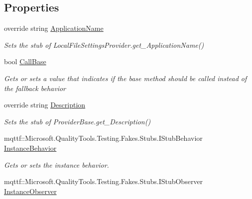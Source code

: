 \subsection*{Properties}
\begin{DoxyCompactItemize}
\item 
override string \hyperlink{class_system_1_1_configuration_1_1_fakes_1_1_stub_local_file_settings_provider_a649047c0f52d093bd5f410030531fea8}{Application\-Name}
\begin{DoxyCompactList}\small\item\em Sets the stub of Local\-File\-Settings\-Provider.\-get\-\_\-\-Application\-Name()\end{DoxyCompactList}\item 
bool \hyperlink{class_system_1_1_configuration_1_1_fakes_1_1_stub_local_file_settings_provider_a5ca3555caf680d27a3cd22b4a5126ff3}{Call\-Base}
\begin{DoxyCompactList}\small\item\em Gets or sets a value that indicates if the base method should be called instead of the fallback behavior\end{DoxyCompactList}\item 
override string \hyperlink{class_system_1_1_configuration_1_1_fakes_1_1_stub_local_file_settings_provider_af040d07048cc52477eab2f9e46f51d53}{Description}
\begin{DoxyCompactList}\small\item\em Sets the stub of Provider\-Base.\-get\-\_\-\-Description()\end{DoxyCompactList}\item 
mqttf\-::\-Microsoft.\-Quality\-Tools.\-Testing.\-Fakes.\-Stubs.\-I\-Stub\-Behavior \hyperlink{class_system_1_1_configuration_1_1_fakes_1_1_stub_local_file_settings_provider_a35c067ec03225f98b3e78ba7bb88ea03}{Instance\-Behavior}
\begin{DoxyCompactList}\small\item\em Gets or sets the instance behavior.\end{DoxyCompactList}\item 
mqttf\-::\-Microsoft.\-Quality\-Tools.\-Testing.\-Fakes.\-Stubs.\-I\-Stub\-Observer \hyperlink{class_system_1_1_configuration_1_1_fakes_1_1_stub_local_file_settings_provider_aee72fe87e728cb382b5464f2f6a5353f}{Instance\-Observer}

\end{DoxyCompactItemize}
